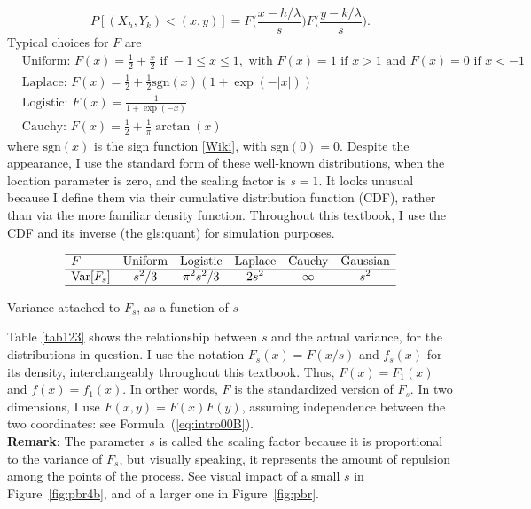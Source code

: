 \documentclass[10pt]{article}
\begin{document}
\begin{equation}
P[(X_h,Y_k)<(x,y)]=F\Big(\frac{x-h/\lambda}{s}\Big)F\Big(\frac{y-k/\lambda}{s}\Big).             \label{eq:intro00B}
\end{equation}
Typical choices for $F$ are
\begin{align}
 & \mbox{Uniform: } F(x) =  \frac{1}{2}+\frac{x}{2} \mbox{ if } -1\leq x \leq 1, \mbox{ with } F(x)=1 \mbox{ if } x>1 \mbox{ and } F(x)=0 \mbox{ if } x < -1 \nonumber\\
 & \mbox{Laplace: } F(x) = \frac{1}{2}+\frac{1}{2} \mbox{sgn}(x)(1+\exp(-|x|))\nonumber \\
& \mbox{Logistic: } F(x) = \frac{1}{1+\exp(-x)}\nonumber\\
& \mbox{Cauchy: } F(x) = \frac{1}{2}+\frac{1}{\pi}\arctan(x) \nonumber
\end{align}
where $\mbox{sgn}(x)$ is the sign function [\href{https://en.wikipedia.org/wiki/Sign_function}{Wiki}], with $\mbox{sgn}(0)=0$. Despite the appearance, I use the standard form of these well-known distributions, when the location parameter is zero, and the scaling factor is $s=1$. It looks unusual because I define them via their cumulative distribution function
(CDF),  %
rather than via the more familiar density function. Throughout this textbook, I use the CDF and its inverse (the \gls{gls:quant}) for simulation purposes.


\begin{table}[H]
\[
\begin{array}{lccccc}
\hline
 F &  \mbox{Uniform} & \mbox{Logistic} & \mbox{Laplace} & \mbox{Cauchy} & \mbox{Gaussian} \\
\hline
 \mbox{Var}[F_s] & s^2/3 & \pi^2 s^2/3 & 2s^2 & \infty &  s^2 \\
\hline
\end{array}
\]
\caption{\label{tab123}Variance attached to $F_s$, as a function of $s$}
\end{table}
Table \ref{tab123} shows the relationship between $s$ and the actual variance, for the distributions in question. I use the notation $F_s(x)=F(x/s)$ and $f_s(x)$ for its density,
interchangeably throughout this textbook. Thus, $F(x)=F_1(x)$ and $f(x)=f_1(x)$. In orther words, $F$ is the standardized version of $F_s$. In two dimensions, I use $F(x,y)=F(x)F(y)$, assuming independence between the two coordinates: see Formula~(\ref{eq:intro00B}). \vspace{1ex} \\
{\bf Remark}: The parameter $s$ is called the scaling factor because it is proportional to the variance of $F_s$, but visually speaking, it represents the amount of repulsion among the points of the process. See visual impact of a small $s$ in Figure~\ref{fig:pbr4b}, and of a larger one in Figure~\ref{fig:pbr}.
\end{document}
